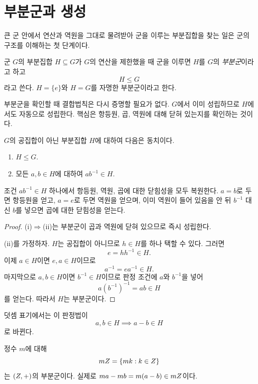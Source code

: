 \section{부분군과 생성}
\label{sec:subgroups}

큰 군 안에서 연산과 역원을 그대로 물려받아 군을 이루는 부분집합을 찾는 일은 군의 구조를 이해하는 첫 단계이다.

\begin{definition}[부분군]
군 $G$의 부분집합 $H\subseteq G$가 $G$의 연산을 제한했을 때 군을 이루면 $H$를 $G$의 \emph{부분군}이라고 하고
\[
  H\le G
\]
라고 쓴다. $H=\{e\}$와 $H=G$를 자명한 부분군이라고 한다.
\end{definition}

부분군을 확인할 때 결합법칙은 다시 증명할 필요가 없다. $G$에서 이미 성립하므로 $H$에서도 자동으로 성립한다. 핵심은 항등원, 곱, 역원에 대해 닫혀 있는지를 확인하는 것이다.

\begin{proposition}
$G$의 공집합이 아닌 부분집합 $H$에 대하여 다음은 동치이다.
\begin{enumerate}[label=(\roman*)]
  \item $H\le G$.
  \item 모든 $a,b\in H$에 대하여 $ab^{-1}\in H$.
\end{enumerate}
\end{proposition}

\begin{proofidea}
조건 $ab^{-1}\in H$ 하나에서 항등원, 역원, 곱에 대한 닫힘성을 모두 복원한다. $a=b$로 두면 항등원을 얻고, $a=e$로 두면 역원을 얻으며, 이미 역원이 들어 있음을 안 뒤 $b^{-1}$ 대신 $b$를 넣으면 곱에 대한 닫힘성을 얻는다.
\end{proofidea}

\begin{proof}
(i)$\Rightarrow$(ii)는 부분군이 곱과 역원에 닫혀 있으므로 즉시 성립한다.

(ii)를 가정하자. $H$는 공집합이 아니므로 $h\in H$를 하나 택할 수 있다. 그러면
\[
  e=hh^{-1}\in H.
\]
이제 $a\in H$이면 $e,a\in H$이므로
\[
  a^{-1}=ea^{-1}\in H.
\]
마지막으로 $a,b\in H$이면 $b^{-1}\in H$이므로 판정 조건에 $a$와 $b^{-1}$을 넣어
\[
  a(b^{-1})^{-1}=ab\in H
\]
를 얻는다. 따라서 $H$는 부분군이다.
\end{proof}

덧셈 표기에서는 이 판정법이
\[
  a,b\in H\implies a-b\in H
\]
로 바뀐다.

\begin{example}
정수 $m$에 대해
\[
  mZ=\{mk:k\in Z\}
\]
는 $(Z,+)$의 부분군이다. 실제로 $ma-mb=m(a-b)\in mZ$이다.
\end{example}

